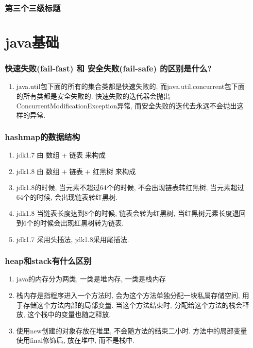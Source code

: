 \documentclass[UTF8]{ctexart}
\begin{document}
	\subsubsection{第三个三级标题}
	
	
	\section{java基础}
	\subsubsection{快速失败(fail-fast) 和 安全失败(fail-safe) 的区别是什么?}
	\begin{enumerate}
		\item java.util包下面的所有的集合类都是快速失败的, 而java.util.concurrent包下面的所有类都是安全失败的. 快速失败的迭代器会抛出ConcurrentModificationException异常, 而安全失败的迭代去永远不会抛出这样的异常.

	\end{enumerate}

	\subsubsection{hashmap的数据结构}
	\begin{enumerate}
		\item jdk1.7 由 数组 + 链表  来构成
		\item jdk1.8 由 数组 + 链表 + 红黑树 来构成
		\item jdk1.8的时候, 当元素不超过64个的时候, 不会出现链表转红黑树, 当元素超过64个的时候, 会出现链表转红黑树.
		\item jdk1.8 当链表长度达到8个的时候, 链表会转为红黑树, 当红黑树元素长度退回到6个的时候会出现红黑树转为链表.
		\item jdk1.7 采用头插法, jdk1.8采用尾插法.
	\end{enumerate}
	\subsubsection{heap和stack有什么区别}
	\begin{enumerate}
		\item java的内存分为两类, 一类是堆内存, 一类是栈内存
		\item 栈内存是指程序进入一个方法时, 会为这个方法单独分配一块私属存储空间, 用于存储这个方法内部的局部变量. 当这个方法结束时, 分配给这个方法的栈会释放, 这个栈中的变量也随之释放.
		\item 使用new创建的对象存放在堆里, 不会随方法的结束二小时. 方法中的局部变量使用final修饰后, 放在堆中, 而不是栈中.
		
	\end{enumerate}
\end{document}

